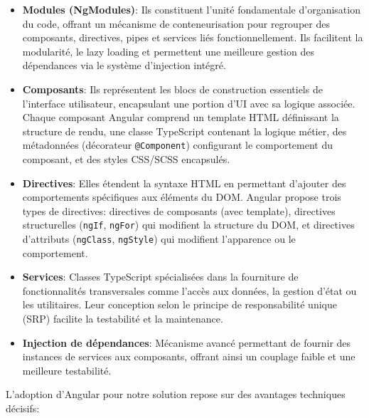  \begin{itemize}
    \item \textbf{Modules (NgModules)}: Ils constituent l'unité fondamentale d'organisation du code, offrant un mécanisme de conteneurisation pour regrouper des composants, directives, pipes et services liés fonctionnellement. Ils facilitent la modularité, le lazy loading et permettent une meilleure gestion des dépendances via le système d'injection intégré.

    \item \textbf{Composants}: Ils représentent les blocs de construction essentiels de l'interface utilisateur, encapsulant une portion d'UI avec sa logique associée. Chaque composant Angular comprend un template HTML définissant la structure de rendu, une classe TypeScript contenant la logique métier, des métadonnées (décorateur \texttt{@Component}) configurant le comportement du composant, et des styles CSS/SCSS encapsulés.

    \item \textbf{Directives}: Elles étendent la syntaxe HTML en permettant d'ajouter des comportements spécifiques aux éléments du DOM. Angular propose trois types de directives: directives de composants (avec template), directives structurelles (\texttt{ngIf}, \texttt{ngFor}) qui modifient la structure du DOM, et directives d'attributs (\texttt{ngClass}, \texttt{ngStyle}) qui modifient l'apparence ou le comportement.

    \item \textbf{Services}: Classes TypeScript spécialisées dans la fourniture de fonctionnalités transversales comme l'accès aux données, la gestion d'état ou les utilitaires. Leur conception selon le principe de responsabilité unique (SRP) facilite la testabilité et la maintenance.

    \item \textbf{Injection de dépendances}: Mécanisme avancé permettant de fournir des instances de services aux composants, offrant ainsi un couplage faible et une meilleure testabilité.
 \end{itemize}


 L'adoption d'Angular pour notre solution repose sur des avantages techniques décisifs:


